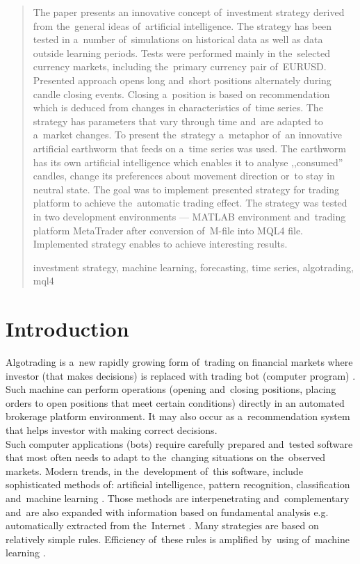 \documentclass[runningheads,a4paper]{llncs}
\newcommand{\keywords}[1]{\par\addvspace\baselineskip
\noindent\keywordname\enspace\ignorespaces#1}
\begin{document}
\begin{abstract}
The paper presents an innovative concept of~investment strategy derived from the~general ideas of~artificial intelligence. The strategy has been tested in a~number of~simulations on historical data as well as data outside learning periods. Tests were performed mainly in the~selected currency markets, including the~primary currency pair of~EURUSD. Presented approach opens long and~short positions alternately during candle closing events. Closing a~position is based on recommendation which is deduced from changes in characteristics of~time series. The strategy has parameters that vary through time and~are adapted to a~market changes. To present the~strategy a~metaphor of~an innovative artificial earthworm that feeds on a~time series was used. The earthworm has its own artificial intelligence which enables it to analyse ,,consumed'' candles, change its preferences about movement direction or~to stay in neutral state. The goal was to implement presented strategy for trading platform to achieve the~automatic trading effect.  The strategy was tested in two development environments --- MATLAB environment and~trading platform MetaTrader after conversion of~M-file into MQL4 file. Implemented strategy enables to achieve interesting results.
\keywords{investment strategy, machine learning, forecasting, time series, algotrading, mql4}
\end{abstract}


\section{Introduction}

Algotrading is a~new rapidly growing form of~trading on financial markets where investor (that makes decisions) is replaced with trading bot (computer program) \cite{Leshik2011,Wilinski2014}. Such machine can perform operations (opening and~closing positions, placing orders to open positions that meet certain conditions) directly in an automated brokerage platform environment. It may also occur as a~recommendation system that helps investor with making correct decisions.\\

Such computer applications (bots) require carefully prepared and~tested software that most often needs to adapt to the~changing situations on the~observed markets. Modern trends, in the~development of~this software, include sophisticated methods of: artificial intelligence, pattern recognition, classification and~machine learning \cite{Leshik2011,Wilinski,wang,sinclare}. Those methods are interpenetrating and~complementary and~are also expanded with information based on fundamental analysis e.g. automatically extracted from the~Internet \cite{elder,Wilinski2014,Schwager1996}. Many strategies are based on relatively simple rules. Efficiency of~these rules is amplified by~using of~machine learning \cite{Wilinski,person,tian,krutsinger,lewis,murphy}.\\
\end{document}
